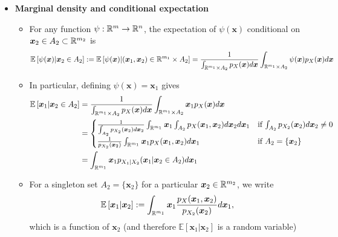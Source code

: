 \documentclass[12pt,a4paper]{article}
\begin{document}
\begin{itemize}
\item \textbf{Marginal density and conditional expectation}
  \begin{itemize}
  \item For any function $\psi:\mathbb{R}^{m}\to\mathbb{R}^{n}$,
    the expectation of $\psi(\bm{x})$ conditional on $\bm{x}_{2}\in A_{2}\subset \mathbb{R}^{m_{2}}$ is
    \begin{equation}\nonumber%
      \mathbb{E}\left[\psi(\bm{x})|\bm{x}_{2}\in A_{2} \right]
      := \mathbb{E}\left[ \psi(\bm{x})| (\bm{x}_{1},\bm{x}_{2})\in \R^{m_{1}}\times A_{2}\right]
      = \frac{1}{\int_{\R^{m_{1}}\times A_{2}}p_{X}(\bm{x})d\bm{x}}\int_{\R^{m_{1}}\times A_{2}}\psi(\bm{x})p_{X}(\bm{x})d\bm{x}
    \end{equation}
  \item In particular, defining $\psi(\bm{x})=\bm{x}_{1}$ gives %
    \begin{align}
      \mathbb{E}\left[ \bm{x}_{1}| \bm{x}_{2}\in A_{2} \right]
        & = \frac{1}{\int_{\R^{m_{1}}\times A_{2}}p_{X}(\bm{x})d\bm{x}}\int_{\R^{m_{1}}\times A_{2}}\bm{x}_{1}p_{X}(\bm{x})d\bm{x} \nonumber \\
        & = 
          \begin{cases}
            \frac{1}{\int_{A_{2}}p_{X_{2}}(\bm{x}_{2})d\bm{x}_{2}}\int_{\R^{m_{1}}}\bm{x}_{1}\int_{A_{2}}p_{X}(\bm{x}_{1},\bm{x}_{2})d\bm{x}_{2}d\bm{x}_{1} & \text{if $\int_{A_{2}}p_{X_{2}}(\bm{x}_{2})d\bm{x}_{2} \neq 0$} \\
            \frac{1}{p_{X_{2}}(\bm{x}_{2})}\int_{\R^{m_{1}}}\bm{x}_{1}p_{X}(\bm{x}_{1},\bm{x}_{2})d\bm{x}_{1} & \text{if $A_{2} = \{\bm{x}_{2}\}$}  \\
          \end{cases}
          \nonumber \\
        & = \int_{\R^{m_{1}}}\bm{x}_{1}p_{X_{1}|X_{2}}(\bm{x}_{1}|\bm{x}_{2}\in A_{2})d\bm{x}_{1}
    \nonumber%
    \end{align}

  \item For a singleton set $A_{2}=\{\bm{x}_{2}\}$ for a particular $\bm{x}_{2}\in \mathbb{R}^{m_{2}}$,
    we write
    \begin{equation}\nonumber%
      \mathbb{E}\left[ \bm{x}_{1}| \bm{x}_{2}\right]
      := \int_{\R^{m_{1}}}\bm{x}_{1}\frac{p_{X}(\bm{x}_{1},\bm{x}_{2})}{p_{X_{2}}(\bm{x}_{2})}d\bm{x}_{1},
    \end{equation}
    which is a function of $\bm{x}_{2}$ (and therefore $\mathbb{E}\left[ \bm{x}_{1}| \bm{x}_{2}\right]$ is a random variable)


\end{itemize}
\end{itemize}
\end{document}

